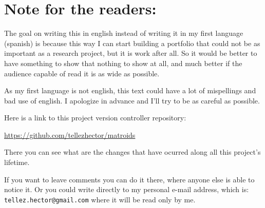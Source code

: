 \chapter*{Note for the readers:}
    The goal on writing this in english instead of writing it in my first language (spanish) is because 
    this way I can start building a portfolio that could not be as important as a research project, but
    it is work after all. So it would be better to have something to show that nothing to show at all, 
    and much better if the audience capable of read it is as wide as possible.\pn
    
    As my first language is not english, this text could have a lot of mispellings and
    bad use of english. I apologize in advance and I'll try to be as careful as possible.\pn
    
    Here is a link to this project version controller repository:\par
    \href{https://github.com/tellezhector/matroids}{https://github.com/tellezhector/matroids}\par
    There you can see what are the changes that have ocurred along all this project's lifetime.\pn
    
    If you want to leave comments you can do it there, where anyone else is able to notice it. Or you could 
    write directly to my personal e-mail address, which is: \texttt{tellez.hector@gmail.com} where it will be read only
    by me.